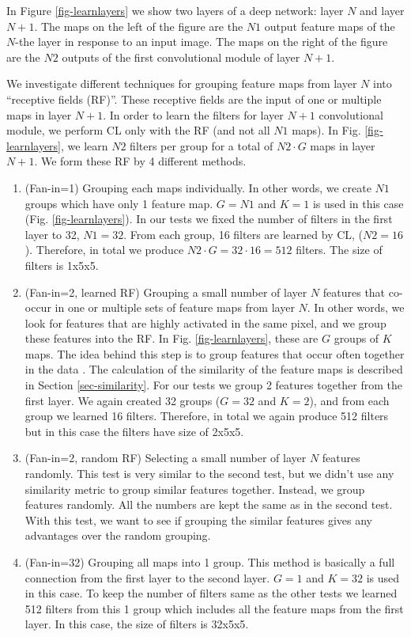 \documentclass{article} %
\begin{document}
In Figure \ref{fig-learnlayers} we show two layers of a deep network: layer $N$ and layer $N+1$. The maps on the left of the figure
are the $N1$ output feature maps of the $N$-the layer in response to an input image. The maps on the right of the figure
are the $N2$ outputs of the first convolutional module of layer $N+1$. 

We investigate different techniques for grouping feature maps from layer $N$ into ``receptive fields (RF)''. These receptive fields 
are the input of one or multiple maps in layer $N+1$. In order to learn the filters for layer $N+1$ convolutional module, we
perform CL only with the RF (and not all $N1$ maps). In Fig. \ref{fig-learnlayers}, we learn $N2$ filters per group for a total of
$N2 \cdot G$ maps in layer $N+1$.
We form these RF by 4 different methods.
\begin{enumerate}
\item (Fan-in=1) Grouping each maps individually. In other words, we create $N1$ groups which have only 1 feature map. 
$G = N1$ and $K = 1$ is used in this case (Fig. \ref{fig-learnlayers}). In our tests we fixed the number of filters in the first layer to 32, $N1=32$. 
From each group, 16 filters are learned by CL, ($N2 = 16$). Therefore, in total we produce $N2 \cdot G = 32 \cdot 16 = 512$ filters. 
The size of filters is 1x5x5. 
\item (Fan-in=2, learned RF) Grouping a small number of layer $N$ features that co-occur in one or multiple sets of feature maps from layer $N$. 
In other words, we look for features that are highly activated in the same pixel, and we group these features into the RF.
In Fig. \ref{fig-learnlayers}, these are $G$ groups of $K$ maps. The idea behind this step is to group features that occur 
often together in the data \cite{masquelier2007learning}. The calculation of the similarity of the feature maps is described in Section \ref{sec-similarity}.
For our tests we group 2 features together from the first layer. We again created 32 groups ($G = 32$ and $K = 2$),
and from each group we learned 16 filters. Therefore, in total we again produce 512 filters but in this case the filters have size 
of 2x5x5. 
\item (Fan-in=2, random RF) Selecting a small number of layer $N$ features randomly. This test is very similar to the second test, but we didn't 
use any similarity metric to group similar features together. Instead, we group features randomly. All the numbers are kept the same as in 
the second test. With this test, we want to see if grouping the similar features gives any advantages over the random grouping.
\item (Fan-in=32) Grouping all maps into 1 group. This method is basically a full connection from the first layer to the second layer. 
$G = 1$ and $K = 32$ is used in this case. To keep the number of filters same as the other tests we learned 512 filters from this 
1 group which includes all the feature maps from the first layer. In this case, the size of filters is 32x5x5. 
\end{enumerate}
\end{document}
